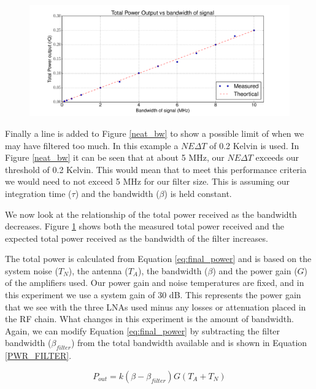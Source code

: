\begin{figure}[h!tb] \centering
\includegraphics[width=\textwidth]{Experiments/Exp5/combined_plot.pdf}
\label{power_bw}
\end{figure}

Finally a line is added to Figure \ref{neat_bw} to show a possible limit of when we may have filtered too much.  In this example a $NE\Delta T$ of 0.2 Kelvin is used.  In Figure \ref{neat_bw} it can be seen that at about 5 MHz, our $NE\Delta T$ exceeds our threshold of 0.2 Kelvin.  This would mean that to meet this performance criteria we would need to not exceed 5 MHz for our filter size.  This is assuming our integration time ($\tau$) and the bandwidth ($\beta$) is held constant. 

We now look at the relationship of the total power received as the bandwidth decreases.  Figure \ref{power_bw} shows both the measured total power received and the expected total power received as the bandwidth of the filter increases.

The total power is calculated from Equation \ref{eq:final_power} and is based on the system noise ($T_N$), the antenna ($T_A$), the bandwidth ($\beta$) and the power gain ($G$) of the amplifiers used.  Our power gain and noise temperatures are fixed, and in this experiment we use a system gain of 30 dB.  This represents the power gain that we see with the three LNAs used minus any losses or attenuation placed in the RF chain.  What changes in this experiment is the amount of bandwidth.  Again, we can modify Equation \ref{eq:final_power} by subtracting the filter bandwidth ($\beta_{filter}$) from the total bandwidth available and is shown in Equation \ref{PWR_FILTER}.

\begin{equation}\label{PWR_FILTER}
P_{out}=k (\beta - \beta_{filter})G(T_{A}+T_{N})
\end{equation}

